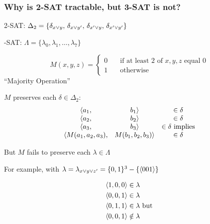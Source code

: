 \documentclass[12pt,xcolor=dvipsnames%
]{beamer}
\renewcommand{\.}{\cdot}
\begin{document}
\begin{frame}
\frametitle{Why is 2-SAT tractable, but 3-SAT is not?}

2-SAT: $\Delta_2=\{\delta_{x\vee y},\,\delta_{x\vee y'},\, \delta_{x'\vee y},\, \delta_{x'\vee y'}\} $

-SAT: $\Lambda=\{\lambda_0,\lambda_1,\dots, \lambda_7\}$

\pause
\begin{equation*}
M(x,y,z) = \begin{cases}
	0 \quad&\text{if at least 2 of $x,y,z$ equal 0}\\
	1 &\text{otherwise}
	\end{cases}
\end{equation*}
``Majority Operation''

\pause
$M$ preserves each $\delta\in \Delta_2$:
\begin{equation*}
\begin{matrix}
\langle a_1, &b_1\rangle &\in \delta\\
\langle a_2, &b_2\rangle &\in \delta\\
\langle a_3, &b_3\rangle &\in \delta \text{ implies}\\
\langle M(a_1,a_2,a_3), &M(b_1,b_2,b_3)\rangle &\in \delta
\end{matrix}
\end{equation*}

\end{frame}

\begin{frame}
But $M$ fails to preserve each $\lambda\in \Lambda$

\medskip
For example, with $\lambda=\lambda_{x\vee y\vee z'}=\{0,1\}^3-\{\langle001\rangle\}$ 

\begin{align*}
\langle1,0,0\rangle &\in \lambda\\
\langle0,0,1\rangle &\in \lambda\\
\langle0,1,1\rangle &\in \lambda \text{ but}\\
\langle0,0,1\rangle &\notin \lambda
\end{align*}

\end{frame}
\end{document}
